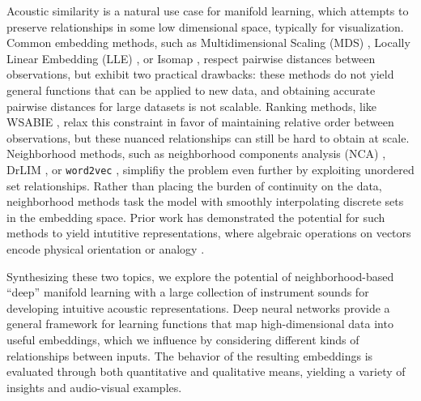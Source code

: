 \documentclass{article}
\begin{document}
Acoustic similarity is a natural use case for manifold learning, which attempts to preserve relationships in some low dimensional space, typically for visualization.
Common embedding methods, such as Multidimensional Scaling (MDS) \cite{}, Locally Linear Embedding (LLE) \cite{}, or Isomap \cite{}, respect pairwise distances between observations, but exhibit two practical drawbacks:
these methods do not yield general functions that can be applied to new data, and obtaining accurate pairwise distances for large datasets is not scalable.
Ranking methods, like WSABIE \cite{weston2011wsabie}, relax this constraint in favor of maintaining relative order between observations, but these nuanced relationships can still be hard to obtain at scale.
Neighborhood methods, such as neighborhood components analysis (NCA) \cite{hinton2004neighborhood}, DrLIM \cite{hadsell2006drlim}, or \texttt{word2vec} \cite{mikolov2013distributed}, simplifiy the problem even further by exploiting unordered set relationships. %
Rather than placing the burden of continuity on the data, neighborhood methods task the model with smoothly interpolating discrete sets in the embedding space.
Prior work has demonstrated the potential for such methods to yield intutitive representations, where algebraic operations on vectors encode physical orientation \cite{hadsell2006drlim} or analogy \cite{mikolov2013efficient}.

Synthesizing these two topics, we explore the potential of neighborhood-based ``deep'' manifold learning with a large collection of instrument sounds for developing intuitive acoustic representations.
Deep neural networks provide a general framework for learning functions that map high-dimensional data into useful embeddings, which we influence by considering different kinds of relationships between inputs.
The behavior of the resulting embeddings is evaluated through both quantitative and qualitative means, yielding a variety of insights and audio-visual examples.
\end{document}
